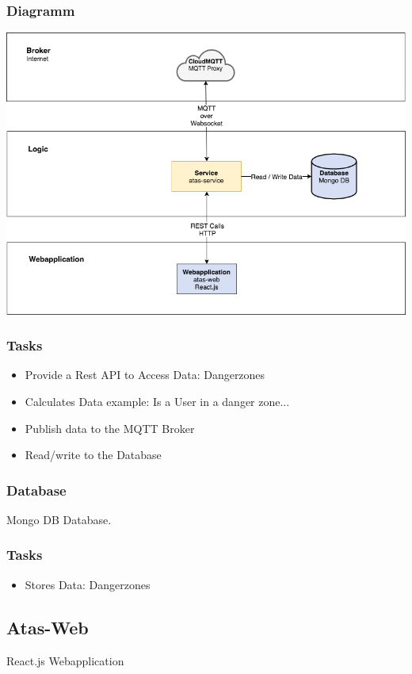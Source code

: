 \documentclass[a4paper,11pt, oneside]{report}
\theoremstyle{definition}
\begin{document}
\subsubsection{Diagramm}
\includegraphics[width=\textwidth]{img/ATAS_SystemOverview_Detail_atasservice.png}


\subsubsection{Tasks}
\begin{itemize}
\item Provide a Rest API to Access Data: Dangerzones
\item Calculates Data example: Is a User in a danger zone...
\item Publish data to the MQTT Broker
\item Read/write to the Database
\end{itemize}

\subsubsection{Database}
Mongo DB Database.
\subsubsection{Tasks}
\begin{itemize}
\item Stores Data: Dangerzones
\end{itemize}


\subsection{Atas-Web}
React.js Webapplication
\end{document}
